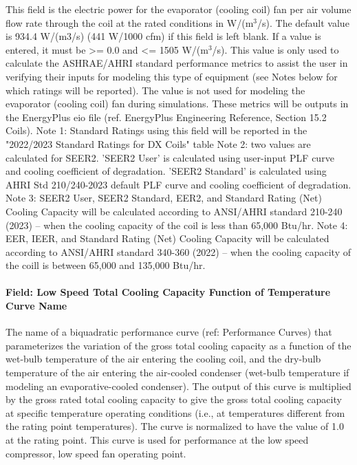 This field is the electric power for the evaporator (cooling coil) fan per air volume flow rate through the coil at the rated conditions in W/(m\(^{3}\)/s). The default value is 934.4 W/(m3/s) (441 W/1000 cfm) if this field is left blank. If a value is entered, it must be \textgreater{}= 0.0 and \textless{}= 1505 W/(m\(^{3}\)/s). This value is only used to calculate the ASHRAE/AHRI standard performance metrics to assist the user in verifying their inputs for modeling this type of equipment (see Notes below for which ratings will be reported).  The value is not used for modeling the evaporator (cooling coil) fan during simulations.  These metrics will be outputs in the EnergyPlus eio file (ref. EnergyPlus Engineering Reference, Section 15.2 Coils).
Note 1: Standard Ratings using this field will be reported in the "2022/2023 Standard Ratings for DX Coils" table
Note 2: two values are calculated for SEER2. 'SEER2 User' is calculated using user-input PLF curve and cooling coefficient of degradation. 'SEER2 Standard' is calculated using AHRI Std 210/240-2023 default PLF curve and cooling coefficient of degradation.
Note 3: SEER2 User, SEER2 Standard, EER2, and Standard Rating (Net) Cooling Capacity will be calculated according to ANSI/AHRI standard 210-240 (2023) -- when the cooling capacity of the coil is less than 65,000 Btu/hr.
Note 4: EER, IEER, and Standard Rating (Net) Cooling Capacity will be calculated according to ANSI/AHRI standard 340-360 (2022) -- when the cooling capacity of the coill is between 65,000 and 135,000 Btu/hr.

\paragraph{Field: Low Speed Total Cooling Capacity Function of Temperature Curve Name}\label{field-low-speed-total-cooling-capacity-function-of-temperature-curve-name}

The name of a biquadratic performance curve (ref: Performance Curves) that parameterizes the variation of the gross total cooling capacity as a function of the wet-bulb temperature of the air entering the cooling coil, and the dry-bulb temperature of the air entering the air-cooled condenser (wet-bulb temperature if modeling an evaporative-cooled condenser). The output of this curve is multiplied by the gross rated total cooling capacity to give the gross total cooling capacity at specific temperature operating conditions (i.e., at temperatures different from the rating point temperatures). The curve is normalized to have the value of 1.0 at the rating point. This curve is used for performance at the low speed compressor, low speed fan operating point.

